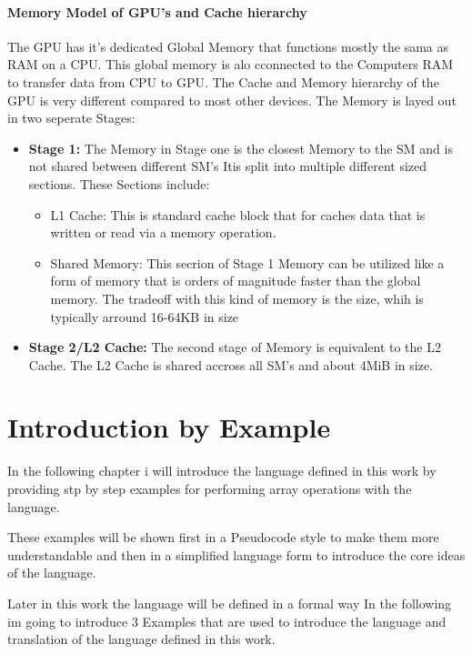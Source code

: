 \subsubsection{Memory Model of GPU's and Cache hierarchy}
The GPU has it's dedicated Global Memory that functions mostly the sama as RAM on a CPU. This global memory is alo cconnected to the Computers RAM to transfer data from CPU to GPU.
The Cache and Memory hierarchy of the GPU is very different compared to most other devices.
The Memory is layed out in two seperate Stages:
\begin{itemize}
    \item \textbf{Stage 1:} The Memory in Stage one is the closest Memory to the SM
          and is not shared between different SM's
          Itis split into multiple different sized sections. These Sections include:
          \begin{itemize}
              \item L1 Cache: This is standard cache block that for caches data that is written or read via a memory operation.
              \item Shared Memory: This secrion of Stage 1 Memory can be utilized like a %
                    form of memory that is orders of magnitude faster than the global memory.
                    The tradeoff with this kind of memory is the size, whih is typically arround
                    16-64KB in size
          \end{itemize}
    \item \textbf{Stage 2/L2 Cache:} The second stage of Memory is equivalent to the L2 Cache. The L2 Cache is shared accross all SM's and about 4MiB in size.
\end{itemize}



\chapter{Introduction by Example}
In the following chapter i will introduce the language defined in this work by providing stp by step examples for performing array operations with the language.

These examples will be shown first in a Pseudocode style to make them more understandable and then in a simplified language form to introduce the core ideas of the language.


Later in this work the language will be defined in a formal way
In the following im going to introduce 3 Examples that are used to introduce the
language and translation of the language defined in this work.

